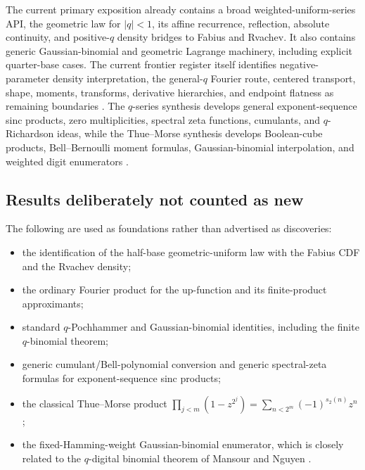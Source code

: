 \documentclass[11pt,oneside]{article}
\theoremstyle{definition}
\theoremstyle{remark}
\begin{document}
The current primary exposition already contains a broad weighted-uniform-series
API, the geometric law for \(|q|<1\), its affine recurrence, reflection,
absolute continuity, and positive-\(q\) density bridges to Fabius and Rvachev.
It also contains generic Gaussian-binomial and geometric Lagrange machinery,
including explicit quarter-base cases.  The current frontier register itself
identifies negative-parameter density interpretation, the general-\(q\)
Fourier route, centered transport, shape, moments, transforms, derivative
hierarchies, and endpoint flatness as remaining boundaries
\cite{repo-frontiers}.  The \(q\)-series synthesis develops general
exponent-sequence sinc products, zero multiplicities, spectral zeta functions,
cumulants, and \(q\)-Richardson ideas, while the Thue--Morse synthesis develops
Boolean-cube products, Bell--Bernoulli moment formulas, Gaussian-binomial
interpolation, and weighted digit enumerators \cite{repo-qseries,repo-thuemorse}.

\subsection{Results deliberately not counted as new}
The following are used as foundations rather than advertised as discoveries:
\begin{itemize}
\item the identification of the half-base geometric-uniform law with the
  Fabius CDF and the Rvachev density;
\item the ordinary Fourier product for the up-function and its finite-product
  approximants;
\item standard \(q\)-Pochhammer and Gaussian-binomial identities, including
  the finite \(q\)-binomial theorem;
\item generic cumulant/Bell-polynomial conversion and generic spectral-zeta
  formulas for exponent-sequence sinc products;
\item the classical Thue--Morse product
  \(\prod_{j<m}(1-z^{2^j})=\sum_{n<2^m}(-1)^{s_2(n)}z^n\);
\item the fixed-Hamming-weight Gaussian-binomial enumerator, which is closely
  related to the \(q\)-digital binomial theorem of Mansour and Nguyen
  \cite{mansour-nguyen}.
\end{itemize}
\end{document}

